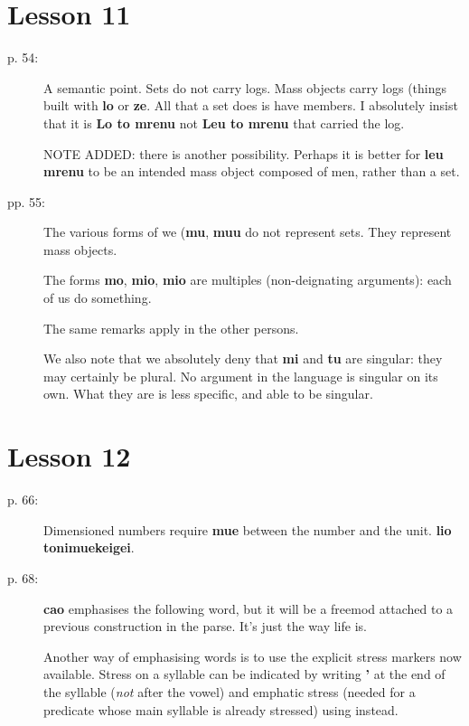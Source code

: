 \documentclass[12pt]{article}
\begin{document}
\section{Lesson 11}

\begin{description}


\item[p. 54:]  A semantic point.  Sets do not carry logs.  Mass objects carry logs (things built with {\bf lo} or {\bf ze}.
All that a set does is have members.  I absolutely insist that it is {\bf Lo to mrenu} not {\bf Leu to mrenu} that carried the log.

NOTE ADDED:  there is another possibility.  Perhaps it is better for {\bf leu mrenu} to be an intended mass object composed of men, rather than a set.

\item[pp. 55:]   The various forms of we ({\bf mu}, {\bf muu} do not represent sets.  They represent mass objects.

The forms {\bf mo}, {\bf mio}, {\bf mio} are multiples (non-deignating arguments):  each of us do something.

The same remarks apply in the other persons.

We also note that we absolutely deny that {\bf mi} and {\bf tu} are singular:  they may certainly be plural.  No argument in the language is singular on its own.  What they are is less specific, and able to be singular.


\end{description}

\section{Lesson 12}

\begin{description}

\item[p. 66:]  Dimensioned numbers require {\bf mue} between the number and the unit.  {\bf lio tonimuekeigei}.

\item[p. 68:]  {\bf cao} emphasises the following word, but it will be a freemod attached to a previous construction in the parse.  It's just the way life is.

Another way of emphasising words is to use the explicit stress markers now available.  Stress on a syllable can be indicated by writing {\bf '} at the end of the syllable ({\em not\/} after the vowel) and emphatic stress (needed for a predicate whose main syllable is already stressed) using {\bf *} instead.

\end{description}
\end{document}
